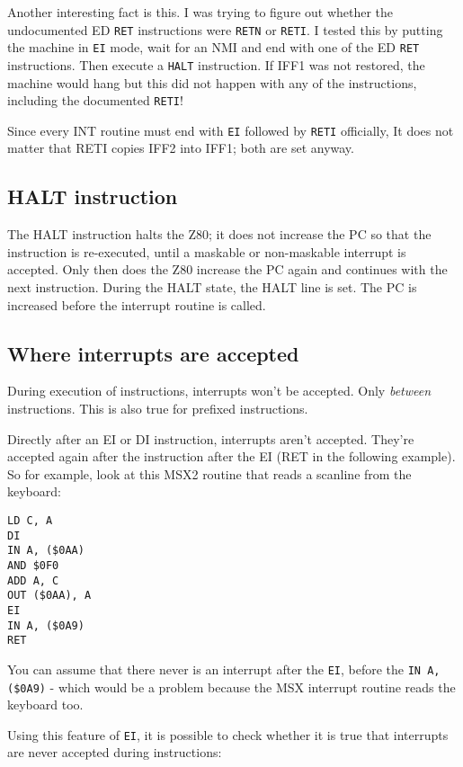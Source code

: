 \documentclass[12pt,twoside,openright,a4paper]{book}
\begin{document}
Another interesting fact is this. I was trying to figure out whether the undocumented ED {\tt RET} instructions were {\tt RETN} or {\tt RETI}. I tested this by putting the machine in {\tt EI} mode, wait for an NMI and end with one of the ED {\tt RET} instructions. Then execute a {\tt HALT} instruction. If IFF1 was not restored, the machine would hang but this did not happen with any of the instructions, including the documented {\tt RETI}!

Since every INT routine must end with {\tt EI} followed by {\tt RETI} officially, It does not matter that RETI copies IFF2 into IFF1; both are set anyway.


\subsection{HALT instruction}

The HALT instruction halts the Z80; it does not increase the PC so that the instruction is re-executed, until a maskable or non-maskable interrupt is accepted. Only then does the Z80 increase the PC again and continues with the next instruction. During the HALT state, the HALT line is set. The PC is increased before the interrupt routine is called.


\subsection{Where interrupts are accepted}

During execution of instructions, interrupts won't be accepted. Only {\em between} instructions. This is also true for prefixed instructions.

Directly after an EI or DI instruction, interrupts aren't accepted. They're accepted again after the instruction after the EI (RET in the following example). So for example, look at this MSX2 routine that reads a scanline from the keyboard:

\begin{Verbatim}
LD C, A
DI
IN A, ($0AA)
AND $0F0
ADD A, C
OUT ($0AA), A
EI
IN A, ($0A9)
RET
\end{Verbatim}

You can assume that there never is an interrupt after the {\tt EI}, before the {\tt IN A,(\$0A9)} - which would be a problem because the MSX interrupt routine reads the keyboard too.

Using this feature of {\tt EI}, it is possible to check whether it is true that interrupts are never accepted during instructions:
\end{document}
